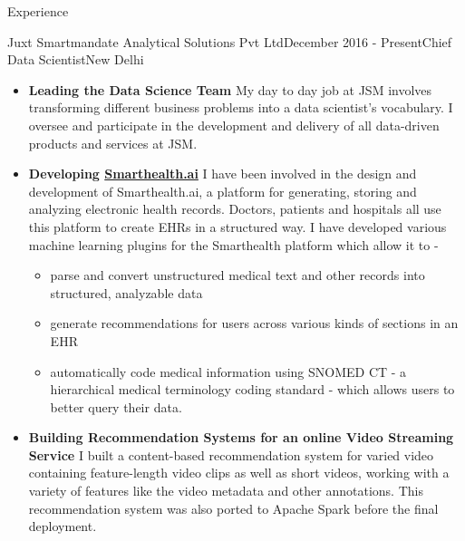 \documentclass{resume} %
\begin{document}

% 
% 


\begin{rSection}{Experience}
\begin{rSubsection}{Juxt Smartmandate Analytical Solutions Pvt Ltd}{December
    2016 - Present}{Chief Data Scientist}{New Delhi}
\begin{itemize}
    \item \textbf{Leading the Data Science Team} My day to day job at JSM
        involves transforming different business problems into a data
        scientist’s vocabulary. I oversee and participate in the development
        and delivery of all data-driven products and services at JSM.
    \item \textbf{Developing \href{http://smarthealth.ai}{Smarthealth.ai}} I
        have been involved in the design and development of Smarthealth.ai, a
        platform for generating, storing and analyzing electronic health
        records. Doctors, patients and hospitals all use this platform to
        create EHRs in a structured way. I have developed various machine
        learning plugins for the Smarthealth platform which allow it to -
        \begin{itemize}
        \item parse and convert unstructured medical text and other records
            into structured, analyzable data
        \item generate recommendations for users across various kinds of
            sections in an EHR
        \item automatically code medical information using SNOMED CT - a
            hierarchical medical terminology coding standard - which allows users
            to better query their data.
        \end{itemize}
    \item \textbf{Building Recommendation Systems for an online Video Streaming Service}
        I built a content-based recommendation system for
        varied video containing feature-length video clips as well as short
        videos, working with a variety of features like the video metadata
        and other annotations. This recommendation system was also ported to
        Apache Spark before the final deployment.
\end{itemize}
\end{rSubsection}


\end{rSection}
\end{document}

